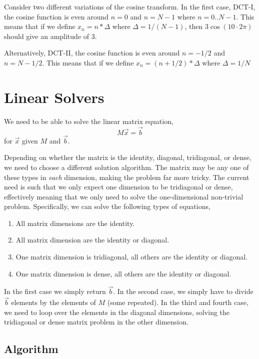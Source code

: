 \documentclass[11pt]{article}
\begin{document}
Consider two different variations of the cosine transform. In the first case, DCT-I, the cosine function is even around $n=0$ and $n=N-1$ where $n=0..N-1$. This means that if we define $x_n = n*\Delta$ where $\Delta = 1/(N-1)$, then $3\cos( 10 \cdot 2\pi)$ should give an amplitude of 3.

Alternatively, DCT-II, the cosine function is even around $n=-1/2$ and $n=N-1/2$. This means that if we define $x_n = (n+1/2)*\Delta$ where $\Delta = 1/N$

%
%

\section{Linear Solvers}

We need to be able to solve the linear matrix equation,
\begin{equation}
M \vec{x} = \vec{b}
\end{equation}
for $\vec{x}$ given $M$ and $\vec{b}$.

Depending on whether the matrix is the identity, diagonal, tridiagonal, or dense, we need to choose a different solution algorithm. The matrix may be any one of these types in \emph{each} dimension, making the problem far more tricky. The current need is such that we only expect one dimension to be tridiagonal or dense, effectively meaning that we only need to solve the one-dimensional non-trivial problem. Specifically, we can solve the following types of equations,
\begin{enumerate}
\item All matrix dimensions are the identity.
\item All matrix dimension are the identity or diagonal.
\item One matrix dimension is tridiagonal, all others are the identity or diagonal.
\item One matrix dimension is dense, all others are the identity or diagonal.
\end{enumerate}

In the first case we simply return $\vec{b}$. In the second case, we simply have to divide $\vec{b}$ elements by the elements of $M$ (some repeated). In the third and fourth case, we need to loop over the elements in the diagonal dimensions, solving the tridiagonal or dense matrix problem in the other dimension.

\subsection{Algorithm}
\end{document}
